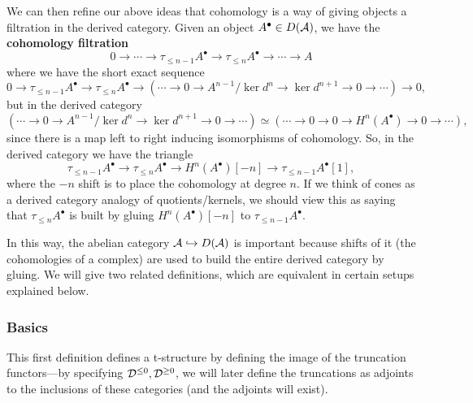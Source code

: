 \documentclass[12pt]{article}
\begin{document}
\begin{rmk}
    We can then refine our above ideas that cohomology is a way of giving objects a filtration in the derived category. Given an object $A^\bullet \in D(\mathcal{A})$, we have the \textbf{cohomology filtration}
    \[0 \to \cdots \to \tau_{\leq n-1} A^\bullet \to \tau_{\leq n} A^\bullet \to \cdots \to A\]
    where we have the short exact sequence
    \[0 \to \tau_{\leq n-1} A^\bullet \to \tau_{\leq n} A^\bullet \to \left(\cdots \to 0 \to A^{n-1}/\ker d^n \to \ker d^{n+1} \to 0\to \cdots\right) \to 0,\]
    but in the derived category
    \[\left(\cdots \to 0 \to A^{n-1}/\ker d^n \to \ker d^{n+1} \to 0\to \cdots\right) \simeq \left(\cdots \to 0 \to 0 \to H^n(A^\bullet) \to 0 \to \cdots \right),\]
    since there is a map left to right inducing isomorphisms of cohomology. So, in the derived category we have the triangle
    \[\tau_{\leq n-1} A^\bullet \to \tau_{\leq n} A^\bullet \to H^n(A^\bullet)[-n] \to \tau_{\leq n-1} A^\bullet [1],\]
    where the $-n$ shift is to place the cohomology at degree $n$. If we think of cones as a derived category analogy of quotients/kernels, we should view this as saying that $\tau_{\leq n} A^\bullet$ is built by gluing $H^n(A^\bullet)[-n]$ to $\tau_{\leq n-1} A^\bullet$.

    In this way, the abelian category $\mathcal{A} \hookrightarrow D(\mathcal{A})$ is important because shifts of it (the cohomologies of a complex) are used to build the entire derived category by gluing. We will give two related definitions, which are equivalent in certain setups explained below.
\end{rmk}

\subsubsection{Basics}

This first definition defines a t-structure by defining the image of the truncation functors---by specifying $\mathcal{D}^{\leq 0}, \mathcal{D}^{\geq 0}$, we will later define the truncations as adjoints to the inclusions of these categories (and the adjoints will exist).
\end{document}
